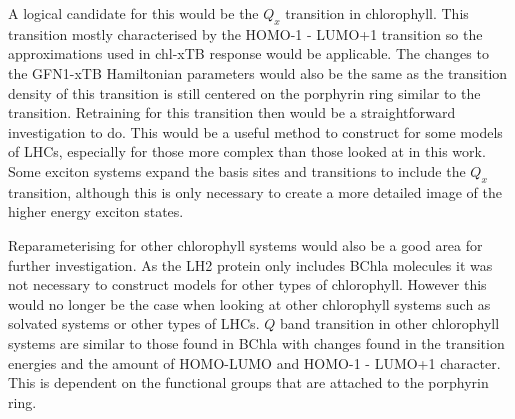 A logical candidate for this would be the $Q_x$ transition in chlorophyll. This 
transition mostly characterised by the HOMO-1 - LUMO+1 transition so the approximations
used in chl-xTB response would be applicable. The changes to the GFN1-xTB Hamiltonian
parameters would also be the same as the transition density of this transition is
still centered on the porphyrin ring similar to the \Qy transition. Retraining for
this transition then would be a straightforward investigation to do. This would 
be a useful method to construct for some models of LHCs, especially for those more
complex than those looked at in this work. Some exciton systems expand the basis
sites and transitions to include the $Q_x$ transition, although this is only necessary
to create a more detailed image of the higher energy exciton states.

Reparameterising for other chlorophyll systems would also be a good area for further
investigation. As the LH2 protein only includes BChla molecules it was not necessary
to construct models for other types of chlorophyll. However this would no longer 
be the case when looking at other chlorophyll systems such as solvated systems or
other types of LHCs. $Q$ band transition in other chlorophyll systems are similar
to those found in BChla with changes found in the transition energies and the amount
of HOMO-LUMO and HOMO-1 - LUMO+1 character. This is dependent on the functional 
groups that are attached to the porphyrin ring.

